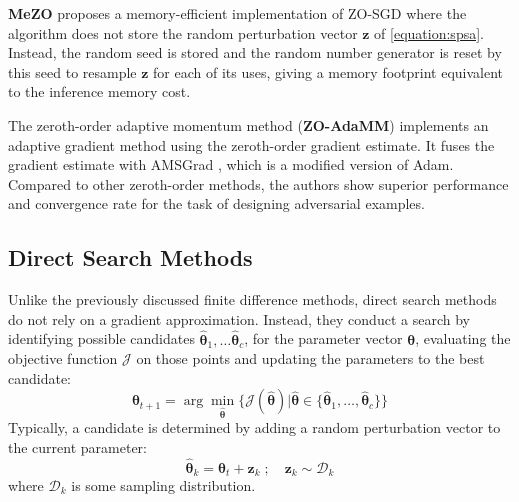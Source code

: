\textbf{MeZO} \parencite{mezo} proposes a memory-efficient 
implementation of ZO-SGD where the algorithm does not store 
the random perturbation vector 
$\mathbf{z}$ of \autoref{equation:spsa}. Instead, 
the random seed is stored and the random number generator
is reset by this seed to resample $\mathbf{z}$ for each 
of its uses, giving a
memory footprint equivalent to the inference memory cost.

The zeroth-order adaptive momentum method (\textbf{ZO-AdaMM})
\parencite{zoadamm} implements an adaptive gradient method
using the zeroth-order gradient estimate. It fuses the 
gradient estimate with AMSGrad 
\parencite{amsgrad}, which is a modified version of Adam. 
Compared to other zeroth-order methods, 
the authors show superior performance and convergence rate 
for the task of designing adversarial examples. 


\subsection{Direct Search Methods} \label{section:directsearch}
Unlike the previously discussed finite difference 
methods, direct search methods do not rely on a 
gradient approximation.
Instead, they conduct a search by identifying 
possible candidates $\bm{\hat{\theta}}_1, \dots \bm{\hat{\theta}}_c$, 
for the parameter vector $\bm{\theta}$, 
evaluating the objective function $\mathcal{J}$ 
on those points and updating the parameters 
to the best candidate: 
\begin{equation}
    \bm{\theta}_{t+1} = \arg\min_{\bm{\hat{\theta}}} \{\mathcal{J}(\bm{\hat{\theta}}) | \bm{\hat{\theta}} \in \{\bm{\hat{\theta}}_1, \dots, \bm{\hat{\theta}}_c\}\}
\end{equation}
Typically, a candidate
is determined by adding a random perturbation vector to
the current parameter: 
\begin{equation}
    \bm{\hat{\theta}}_k = \bm{\theta}_t + \mathbf{z}_k \;;\quad \mathbf{z}_k \sim \mathcal{D}_k 
\end{equation}
where $\mathcal{D}_k$ is some sampling distribution.

